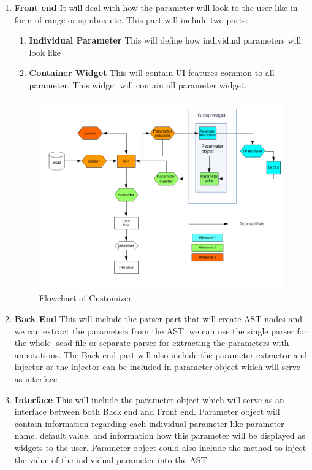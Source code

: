 \documentclass[12pt,includeheadfoot,a4paper]{report}
\begin{document}
\begin{enumerate}
	\item \textbf{Front end}
	It will deal with how the parameter will look to the user like in form of range or spinbox etc. This part will include two parts:
	\begin{enumerate}
		\item \textbf{Individual Parameter}
		This will define how individual parameters will look like
		\item \textbf{Container Widget}
		This will contain UI features common to all parameter. This widget will contain all parameter widget.	
	\end{enumerate}
	
	\begin{figure}[H]
		\centering \includegraphics[width=\linewidth]{images/flowchart.png}
		\caption{Flowchart of Customizer}
		\label{fig:FD1}
	\end{figure}
	
	\item \textbf{Back End}
	This will include the parser part that will create AST nodes and we can extract the parameters from the AST. we can use the single parser for the whole .scad file or separate parser for extracting the parameters with annotations.
	The Back-end part will also include the parameter extractor and injector or the injector can be included in parameter object which will serve as interface
	\item \textbf{Interface}
	This will include the parameter object which will serve as an interface between both Back end and Front end. Parameter object will contain information regarding each individual parameter like parameter name, default value, and information how this parameter will be displayed as widgets to the user. Parameter object could also include the method to inject the value of the individual parameter into the AST.
	
\end{enumerate}
\end{document}
